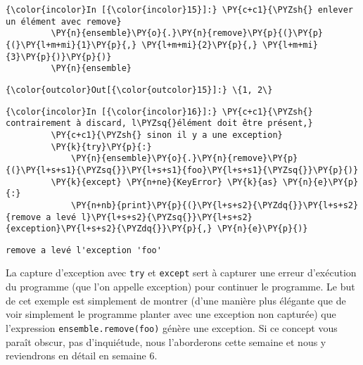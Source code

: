     \begin{Verbatim}[commandchars=\\\{\},frame=single,framerule=0.3mm,rulecolor=\color{cellframecolor}]
{\color{incolor}In [{\color{incolor}15}]:} \PY{c+c1}{\PYZsh{} enlever un élément avec remove}
         \PY{n}{ensemble}\PY{o}{.}\PY{n}{remove}\PY{p}{(}\PY{p}{(}\PY{l+m+mi}{1}\PY{p}{,} \PY{l+m+mi}{2}\PY{p}{,} \PY{l+m+mi}{3}\PY{p}{)}\PY{p}{)}
         \PY{n}{ensemble}
\end{Verbatim}


\begin{Verbatim}[commandchars=\\\{\},frame=single,framerule=0.3mm,rulecolor=\color{cellframecolor}]
{\color{outcolor}Out[{\color{outcolor}15}]:} \{1, 2\}
\end{Verbatim}
            
    \begin{Verbatim}[commandchars=\\\{\},frame=single,framerule=0.3mm,rulecolor=\color{cellframecolor}]
{\color{incolor}In [{\color{incolor}16}]:} \PY{c+c1}{\PYZsh{} contrairement à discard, l\PYZsq{}élément doit être présent,}
         \PY{c+c1}{\PYZsh{} sinon il y a une exception}
         \PY{k}{try}\PY{p}{:}
             \PY{n}{ensemble}\PY{o}{.}\PY{n}{remove}\PY{p}{(}\PY{l+s+s1}{\PYZsq{}}\PY{l+s+s1}{foo}\PY{l+s+s1}{\PYZsq{}}\PY{p}{)}
         \PY{k}{except} \PY{n+ne}{KeyError} \PY{k}{as} \PY{n}{e}\PY{p}{:}
             \PY{n+nb}{print}\PY{p}{(}\PY{l+s+s2}{\PYZdq{}}\PY{l+s+s2}{remove a levé l}\PY{l+s+s2}{\PYZsq{}}\PY{l+s+s2}{exception}\PY{l+s+s2}{\PYZdq{}}\PY{p}{,} \PY{n}{e}\PY{p}{)}
\end{Verbatim}


    \begin{Verbatim}[commandchars=\\\{\},frame=single,framerule=0.3mm,rulecolor=\color{cellframecolor}]
remove a levé l'exception 'foo'
\end{Verbatim}

    La capture d'exception avec \texttt{try} et \texttt{except} sert à
capturer une erreur d'exécution du programme (que l'on appelle
exception) pour continuer le programme. Le but de cet exemple est
simplement de montrer (d'une manière plus élégante que de voir
simplement le programme planter avec une exception non capturée) que
l'expression
\texttt{ensemble.remove(\textquotesingle{}foo\textquotesingle{})} génère
une exception. Si ce concept vous paraît obscur, pas d'inquiétude, nous
l'aborderons cette semaine et nous y reviendrons en détail en semaine 6.

